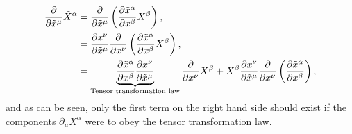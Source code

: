 \begin{align}
\frac{\partial}{\partial \tilde{x}^\mu} \tilde{X}^\alpha &= \frac{\partial}{\partial \tilde{x}^\mu}\left( \frac{\partial \tilde{x}^\alpha}{\partial x^\beta}{X}^\beta\right),\\
                                                         &= \frac{\partial x^\nu}{\partial \tilde{x}^\mu}\frac{\partial}{\partial {x}^\nu}\left( \frac{\partial \tilde{x}^\alpha}{\partial x^\beta}{X}^\beta\right),\\
                                                         &= \underbrace{\frac{\partial \tilde{x}^\alpha}{\partial x^\beta}\frac{\partial x^\nu}{\partial \tilde{x}^\mu}}_{\mathrm{Tensor}\,\,\rm{transformation}\,\,\rm{law}}\frac{\partial}{\partial {x}^\nu} {X}^\beta + {X}^\beta\frac{\partial x^\nu}{\partial \tilde{x}^\mu}\frac{\partial}{\partial {x}^\nu}\left( \frac{\partial \tilde{x}^\alpha}{\partial x^\beta}\right),
\end{align}
and as can be seen, only the first term on the right hand side should exist if the components $\partial_\mu X^\alpha$ were to obey the tensor transformation law.

